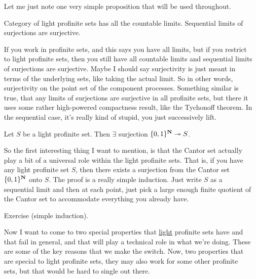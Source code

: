 \begin{example}
\begin{proposition}
\begin{enumerate}
\end{enumerate}

\end{proposition}

Let me just note one very simple proposition that will be used throughout. 
\begin{proposition}

Category of light profinite sets has all the countable limits. Sequential limits of surjections are surjective.

\end{proposition}

If you work in profinite sets, and this says you have all limits, but if you restrict to light profinite sets, then you still have all countable limits and sequential limits of surjections are surjective. Maybe I should say surjectivity is just meant in terms of the underlying sets, like taking the actual limit. So in other words, surjectivity on the point set of the component processes. 
Something similar is true, that any limits of surjections are surjective in all profinite sets, but there it uses some rather high-powered compactness result, like the Tychonoff theorem. In the sequential case, it's really kind of stupid, you just successively lift.

\begin{proposition}
Let $S$ be a light profinite set. Then $\exists$ surjection $\{ 0,1 \}^{\mathbf N} \twoheadrightarrow S$.
\end{proposition}
So the first interesting thing I want to mention, is that the Cantor set actually play a bit of a universal role within the light profinite sets. That is, if you have any light profinite set $S$, then there exists a surjection from the Cantor set $\{ 0,1 \}^{\mathbf N}$ onto $S$. 
The proof is a really simple induction. Just write $S$ as a sequential limit and then at each point, just pick a large enough finite quotient of the Cantor set to accommodate everything you already have.

\begin{sketch}
Exercise (simple induction).
\end{sketch}

Now I want to come to two special properties that \underline{light} profinite sets have and that fail in general, and that will play a technical role in what we're doing. These are some of the key reasons that we make the switch. Now, two properties that are special to light profinite sets, they may also work for some other profinite sets, but that would be hard to single out there.


\end{example}
